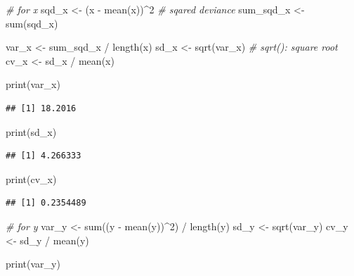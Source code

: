 \documentclass[
]{book}
\newenvironment{Shaded}{\begin{snugshade}}{\end{snugshade}}
\newcommand{\CommentTok}[1]{\textcolor[rgb]{0.56,0.35,0.01}{\textit{#1}}}
\newcommand{\DecValTok}[1]{\textcolor[rgb]{0.00,0.00,0.81}{#1}}
\newcommand{\FunctionTok}[1]{\textcolor[rgb]{0.00,0.00,0.00}{#1}}
\newcommand{\NormalTok}[1]{#1}
\newcommand{\OtherTok}[1]{\textcolor[rgb]{0.56,0.35,0.01}{#1}}
\newcommand{\SpecialCharTok}[1]{\textcolor[rgb]{0.00,0.00,0.00}{#1}}
\begin{document}
\begin{Shaded}
\begin{Highlighting}[]
\CommentTok{\# for x}
\NormalTok{sqd\_x }\OtherTok{\textless{}{-}}\NormalTok{ (x }\SpecialCharTok{{-}} \FunctionTok{mean}\NormalTok{(x))}\SpecialCharTok{\^{}}\DecValTok{2} \CommentTok{\# sqared deviance}
\NormalTok{sum\_sqd\_x }\OtherTok{\textless{}{-}} \FunctionTok{sum}\NormalTok{(sqd\_x)}

\NormalTok{var\_x }\OtherTok{\textless{}{-}}\NormalTok{ sum\_sqd\_x }\SpecialCharTok{/} \FunctionTok{length}\NormalTok{(x)}
\NormalTok{sd\_x }\OtherTok{\textless{}{-}} \FunctionTok{sqrt}\NormalTok{(var\_x) }\CommentTok{\# sqrt(): square root}
\NormalTok{cv\_x }\OtherTok{\textless{}{-}}\NormalTok{ sd\_x }\SpecialCharTok{/} \FunctionTok{mean}\NormalTok{(x)}

\FunctionTok{print}\NormalTok{(var\_x)}
\end{Highlighting}
\end{Shaded}

\begin{verbatim}
## [1] 18.2016
\end{verbatim}

\begin{Shaded}
\begin{Highlighting}[]
\FunctionTok{print}\NormalTok{(sd\_x)}
\end{Highlighting}
\end{Shaded}

\begin{verbatim}
## [1] 4.266333
\end{verbatim}

\begin{Shaded}
\begin{Highlighting}[]
\FunctionTok{print}\NormalTok{(cv\_x)}
\end{Highlighting}
\end{Shaded}

\begin{verbatim}
## [1] 0.2354489
\end{verbatim}

\begin{Shaded}
\begin{Highlighting}[]
\CommentTok{\# for y}
\NormalTok{var\_y }\OtherTok{\textless{}{-}} \FunctionTok{sum}\NormalTok{((y }\SpecialCharTok{{-}} \FunctionTok{mean}\NormalTok{(y))}\SpecialCharTok{\^{}}\DecValTok{2}\NormalTok{) }\SpecialCharTok{/} \FunctionTok{length}\NormalTok{(y)}
\NormalTok{sd\_y }\OtherTok{\textless{}{-}} \FunctionTok{sqrt}\NormalTok{(var\_y)}
\NormalTok{cv\_y }\OtherTok{\textless{}{-}}\NormalTok{ sd\_y }\SpecialCharTok{/} \FunctionTok{mean}\NormalTok{(y)}

\FunctionTok{print}\NormalTok{(var\_y)}
\end{Highlighting}
\end{Shaded}
\end{document}
